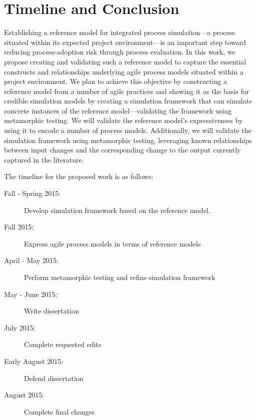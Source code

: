 \chapter{Timeline and Conclusion}
Establishing a reference model for integrated process simulation---a process
situated within its expected project environment---is an important step toward
reducing process-adoption risk through \apriori process evaluation.
In this work, we propose creating and validating such a reference model to
capture the essential constructs and relationships underlying agile process
models situated within a project environment.
We plan to achieve this objective
by constructing a reference model from a number of agile practices and showing
it as the basis for credible simulation models by creating a simulation framework that can simulate concrete instances of the reference
model---validating the framework using metamorphic testing.  We will validate
the reference model's expressiveness by using it to encode a number of process
models.  Additionally, we will validate the simulation framework using
metamorphic testing, leveraging known relationships between input changes
and the corresponding change to the output currently captured in the literature.

%
%

The timeline for the proposed work is as follows:
\begin{description}
\item[Fall - Spring 2015:]  Develop simulation framework based on the reference
model.
\item[Fall 2015:]  Express agile process models in terms of reference models
\item[April - May 2015:]   Perform metamorphic testing and refine simulation
framework
\item[May - June 2015:]  Write dissertation
\item[July 2015:]  Complete requested edits
\item[Early August 2015:]  Defend dissertation
\item[August 2015:]  Complete final changes
\end{description}




